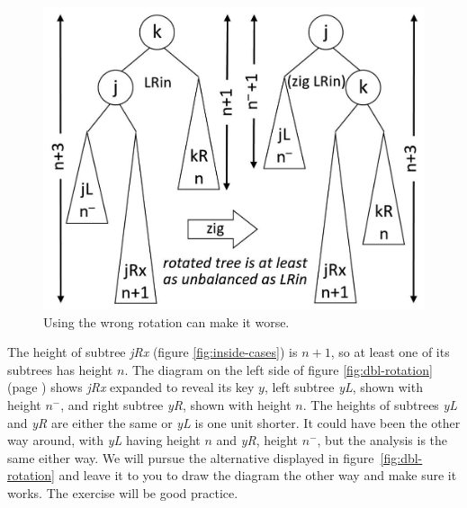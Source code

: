 \begin{figure}
\begin{center}
\includegraphics[scale=1]{images-cmyk/badzig}
\end{center}
\caption{Using the wrong rotation can make it worse.}
\label{fig:badzig}
\end{figure}

The height of subtree \emph{jRx}
(figure \ref{fig:inside-cases}) is $n+1$,
so at least one of its subtrees has height $n$.
The diagram on the left side of
figure \ref{fig:dbl-rotation} (page \pageref{fig:dbl-rotation})
shows \emph{jRx} expanded to reveal its key $y$,
left subtree \emph{yL}, shown with height $n^-$,
and right subtree \emph{yR}, shown with height $n$.
The heights of subtrees \emph{yL} and \emph{yR} are either the same
or \emph{yL} is one unit shorter. It could
have been the other way around, with
\emph{yL} having height $n$ and \emph{yR}, height $n^-$,
but the analysis is the same either way.
We will pursue the alternative
displayed in figure~\ref{fig:dbl-rotation}
and leave it to you to draw the diagram the other way
and make sure it works. The exercise will be good practice.

